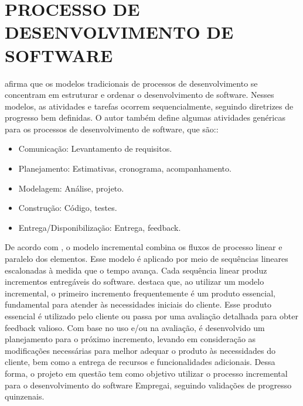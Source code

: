\chapter{PROCESSO DE DESENVOLVIMENTO DE SOFTWARE}\label{cap:desenvolvimento}
\textcite{Pressman2016} afirma que os modelos tradicionais de processos de desenvolvimento se concentram em estruturar e ordenar o desenvolvimento de 
software. Nesses modelos, as atividades e tarefas ocorrem sequencialmente, seguindo diretrizes de progresso bem definidas. O autor também define algumas 
atividades genéricas para os processos de desenvolvimento de software, que são::
\begin{itemize}[label=$\bullet$]
	\item Comunicação: Levantamento de requisitos.
	\item Planejamento: Estimativas, cronograma, acompanhamento.
	\item Modelagem: Análise, projeto.
	\item Construção: Código, testes.
	\item Entrega/Disponibilização: Entrega, feedback.
	\end{itemize}
	De acordo com \textcite{Pressman2016}, o modelo incremental combina os fluxos de processo linear e paralelo dos elementos. Esse modelo é aplicado por
	meio de sequências lineares escalonadas à medida que o tempo avança. Cada sequência linear produz incrementos entregáveis do software. \newline
	\textcite{Pressman2016} destaca que, ao utilizar um modelo incremental, o primeiro incremento frequentemente é um produto essencial, fundamental 
	para atender às necessidades iniciais do cliente. Esse produto essencial é utilizado pelo cliente ou passa por uma avaliação detalhada para obter feedback valioso. 
	Com base no uso e/ou na avaliação, é desenvolvido um planejamento para o próximo incremento, levando em consideração as modificações necessárias para melhor adequar o 
	produto às necessidades do cliente, bem como a entrega de recursos e funcionalidades adicionais.
	\newline Dessa forma, o projeto em questão tem como objetivo utilizar o processo incremental para o desenvolvimento do software Empregai, seguindo validações de progresso quinzenais.


